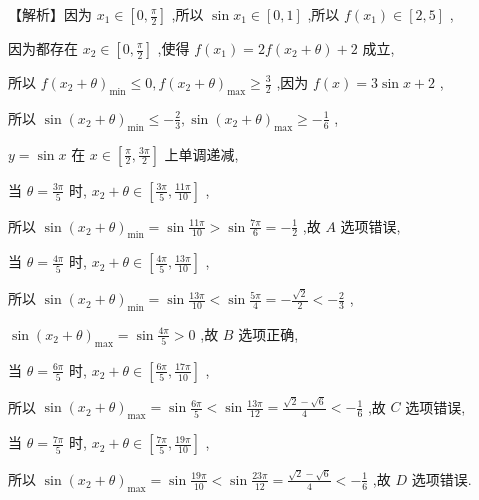 \documentclass[10pt]{article}
\begin{document}
【解析】因为 \({x}_{1} \in  \left\lbrack  {0,\frac{\pi }{2}}\right\rbrack\) ,所以 \(\sin {x}_{1} \in  \left\lbrack  {0,1}\right\rbrack\) ,所以 \(f\left( {x}_{1}\right)  \in  \left\lbrack  {2,5}\right\rbrack\) ,

因为都存在 \({x}_{2} \in  \left\lbrack  {0,\frac{\pi }{2}}\right\rbrack\) ,使得 \(f\left( {x}_{1}\right)  = {2f}\left( {{x}_{2} + \theta }\right)  + 2\) 成立,

所以 \(f{\left( {x}_{2} + \theta \right) }_{\min } \leq  0,f{\left( {x}_{2} + \theta \right) }_{\max } \geq  \frac{3}{2}\) ,因为 \(f\left( x\right)  = 3\sin x + 2\) ,

所以 \(\sin {\left( {x}_{2} + \theta \right) }_{\min } \leq   - \frac{2}{3},\sin {\left( {x}_{2} + \theta \right) }_{\max } \geq   - \frac{1}{6}\) ,

\(y = \sin x\) 在 \(x \in  \left\lbrack  {\frac{\pi }{2},\frac{3\pi }{2}}\right\rbrack\) 上单调递减,

当 \(\theta  = \frac{3\pi }{5}\) 时, \({x}_{2} + \theta  \in  \left\lbrack  {\frac{3\pi }{5},\frac{11\pi }{10}}\right\rbrack\) ,

所以 \(\sin {\left( {x}_{2} + \theta \right) }_{\min } = \sin \frac{11\pi }{10} > \sin \frac{7\pi }{6} =  - \frac{1}{2}\) ,故 \(A\) 选项错误,

当 \(\theta  = \frac{4\pi }{5}\) 时, \({x}_{2} + \theta  \in  \left\lbrack  {\frac{4\pi }{5},\frac{13\pi }{10}}\right\rbrack\) ,

所以 \(\sin {\left( {x}_{2} + \theta \right) }_{\min } = \sin \frac{13\pi }{10} < \sin \frac{5\pi }{4} =  - \frac{\sqrt{2}}{2} <  - \frac{2}{3}\) ,

\(\sin {\left( {x}_{2} + \theta \right) }_{\max } = \sin \frac{4\pi }{5} > 0\) ,故 \(B\) 选项正确,

当 \(\theta  = \frac{6\pi }{5}\) 时, \({x}_{2} + \theta  \in  \left\lbrack  {\frac{6\pi }{5},\frac{17\pi }{10}}\right\rbrack\) ,

所以 \(\sin {\left( {x}_{2} + \theta \right) }_{\max } = \sin \frac{6\pi }{5} < \sin \frac{13\pi }{12} = \frac{\sqrt{2} - \sqrt{6}}{4} <  - \frac{1}{6}\) ,故 \(C\) 选项错误,

当 \(\theta  = \frac{7\pi }{5}\) 时, \({x}_{2} + \theta  \in  \left\lbrack  {\frac{7\pi }{5},\frac{19\pi }{10}}\right\rbrack\) ,

所以 \(\sin {\left( {x}_{2} + \theta \right) }_{\max } = \sin \frac{19\pi }{10} < \sin \frac{23\pi }{12} = \frac{\sqrt{2} - \sqrt{6}}{4} <  - \frac{1}{6}\) ,故 \(D\) 选项错误.
\end{document}
